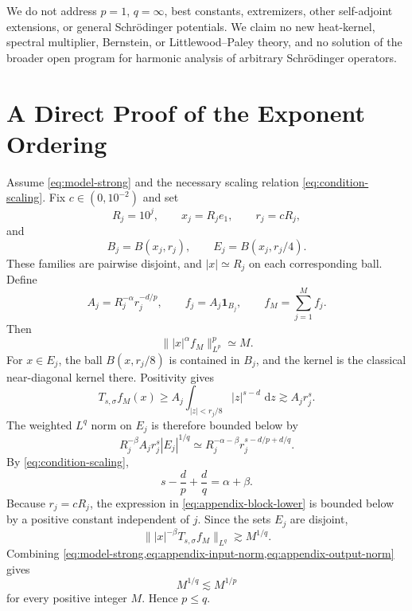 \documentclass[11pt]{amsart}
\numberwithin{equation}{section}
\theoremstyle{plain}
\theoremstyle{definition}
\theoremstyle{remark}
\newcommand{\dd}{\,\mathrm{d}}
\newcommand{\one}{\mathbf{1}}
\begin{document}
We do not address $p=1$, $q=\infty$, best constants, extremizers, other self-adjoint extensions, or general Schr\"odinger potentials. We claim no new heat-kernel, spectral multiplier, Bernstein, or Littlewood--Paley theory, and no solution of the broader open program for harmonic analysis of arbitrary Schr\"odinger operators.

\appendix
\section{A Direct Proof of the Exponent Ordering}
\label{app:pq}

Assume \cref{eq:model-strong} and the necessary scaling relation \cref{eq:condition-scaling}. Fix $c\in(0,10^{-2})$ and set
\begin{equation}
 R_j=10^j,
 \qquad
 x_j=R_je_1,
 \qquad
 r_j=cR_j,
 \label{eq:appendix-scales}
\end{equation}
and
\begin{equation}
 B_j=B(x_j,r_j),
 \qquad
 E_j=B(x_j,r_j/4).
 \label{eq:appendix-balls}
\end{equation}
These families are pairwise disjoint, and $|x|\simeq R_j$ on each corresponding ball. Define
\begin{equation}
 A_j=R_j^{-\alpha}r_j^{-d/p},
 \qquad
 f_j=A_j\one_{B_j},
 \qquad
 f_M=\sum_{j=1}^M f_j.
 \label{eq:appendix-functions}
\end{equation}
Then
\begin{equation}
 \bigl\||x|^\alpha f_M\bigr\|_{L^p}^p
 \simeq M.
 \label{eq:appendix-input-norm}
\end{equation}
For $x\in E_j$, the ball $B(x,r_j/8)$ is contained in $B_j$, and the kernel is the classical near-diagonal kernel there. Positivity gives
\begin{equation}
 T_{s,\sigma}f_M(x)
 \ge A_j\int_{|z|<r_j/8}|z|^{s-d}\,\dd z
 \gtrsim A_jr_j^s.
 \label{eq:appendix-output-lower}
\end{equation}
The weighted $L^q$ norm on $E_j$ is therefore bounded below by
\begin{equation}
 R_j^{-\beta}A_jr_j^s|E_j|^{1/q}
 \simeq
 R_j^{-\alpha-\beta}r_j^{s-d/p+d/q}.
 \label{eq:appendix-block-lower}
\end{equation}
By \cref{eq:condition-scaling},
\begin{equation}
 s-\frac dp+\frac dq=\alpha+\beta.
 \label{eq:appendix-scaling-identity}
\end{equation}
Because $r_j=cR_j$, the expression in \cref{eq:appendix-block-lower} is bounded below by a positive constant independent of $j$. Since the sets $E_j$ are disjoint,
\begin{equation}
 \bigl\||x|^{-\beta}T_{s,\sigma}f_M\bigr\|_{L^q}
 \gtrsim M^{1/q}.
 \label{eq:appendix-output-norm}
\end{equation}
Combining \cref{eq:model-strong,eq:appendix-input-norm,eq:appendix-output-norm} gives
\[
 M^{1/q}\lesssim M^{1/p}
\]
for every positive integer $M$. Hence $p\le q$.



\end{document}
